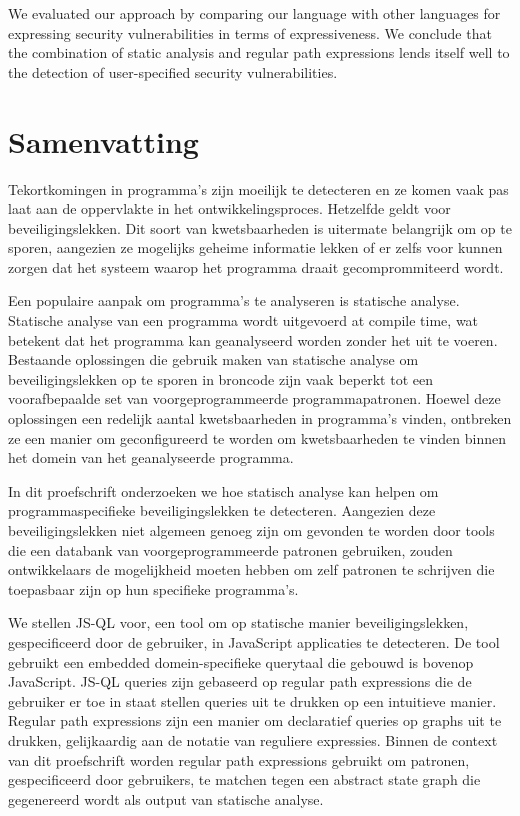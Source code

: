 \documentclass[a4paper, 12pt]{report}
\theoremstyle{definition}
\begin{document}
We evaluated our approach by comparing our language with other languages for expressing security vulnerabilities in terms of expressiveness. We conclude that the combination of static analysis and regular path expressions lends itself well to the detection of user-specified security vulnerabilities.

\chapter*{Samenvatting}

Tekortkomingen in programma's zijn moeilijk te detecteren en ze komen vaak pas laat aan de oppervlakte in het ontwikkelingsproces. Hetzelfde geldt voor beveiligingslekken. Dit soort van kwetsbaarheden is uitermate belangrijk om op te sporen, aangezien ze mogelijks geheime informatie lekken of er zelfs voor kunnen zorgen dat het systeem waarop het programma draait gecomprommiteerd wordt.
 
Een populaire aanpak om programma's te analyseren is statische analyse. Statische analyse van een programma wordt uitgevoerd at compile time, wat betekent dat het programma kan geanalyseerd worden zonder het uit te voeren. Bestaande oplossingen die gebruik maken van statische analyse om beveiligingslekken op te sporen in broncode zijn vaak beperkt tot een voorafbepaalde set van voorgeprogrammeerde programmapatronen. Hoewel deze oplossingen een redelijk aantal kwetsbaarheden in programma's vinden, ontbreken ze een manier om geconfigureerd te worden om kwetsbaarheden te vinden binnen het domein van het geanalyseerde programma.

In dit proefschrift onderzoeken we hoe statisch analyse kan helpen om programmaspecifieke beveiligingslekken te detecteren. Aangezien deze beveiligingslekken niet algemeen genoeg zijn om gevonden te worden door tools die een databank van voorgeprogrammeerde patronen gebruiken, zouden ontwikkelaars de mogelijkheid moeten hebben om zelf patronen te schrijven die toepasbaar zijn op hun specifieke programma's.

We stellen JS-QL voor, een tool om op statische manier beveiligingslekken, gespecificeerd door de gebruiker, in JavaScript applicaties te detecteren. De tool gebruikt een embedded domein-specifieke querytaal die gebouwd is bovenop JavaScript. JS-QL queries zijn gebaseerd op regular path expressions die de gebruiker er toe in staat stellen queries uit te drukken op een intuitieve manier. Regular path expressions zijn een manier om declaratief queries op graphs uit te drukken, gelijkaardig aan de notatie van reguliere expressies. Binnen de context van dit proefschrift worden regular path expressions gebruikt om patronen, gespecificeerd door gebruikers, te matchen tegen een abstract state graph die gegenereerd wordt als output van statische analyse.
\end{document}

